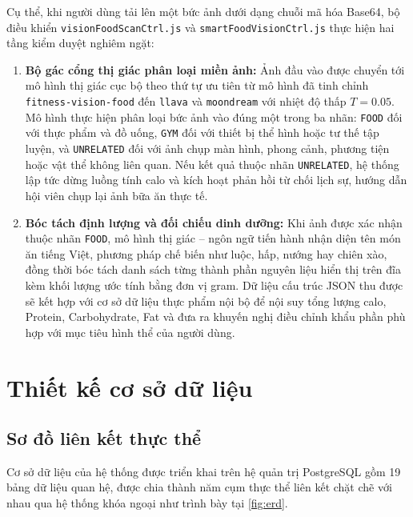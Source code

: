Cụ thể, khi người dùng tải lên một bức ảnh dưới dạng chuỗi mã hóa Base64, bộ điều khiển \texttt{visionFoodScanCtrl.js} và \texttt{smartFoodVisionCtrl.js} thực hiện hai tầng kiểm duyệt nghiêm ngặt:
\begin{enumerate}[label=\arabic*.]
    \item \textbf{Bộ gác cổng thị giác phân loại miền ảnh:} Ảnh đầu vào được chuyển tới mô hình thị giác cục bộ theo thứ tự ưu tiên từ mô hình đã tinh chỉnh \texttt{fitness-vision-food} đến \texttt{llava} và \texttt{moondream} với nhiệt độ thấp $T = 0.05$. Mô hình thực hiện phân loại bức ảnh vào đúng một trong ba nhãn: \texttt{FOOD} đối với thực phẩm và đồ uống, \texttt{GYM} đối với thiết bị thể hình hoặc tư thế tập luyện, và \texttt{UNRELATED} đối với ảnh chụp màn hình, phong cảnh, phương tiện hoặc vật thể không liên quan. Nếu kết quả thuộc nhãn \texttt{UNRELATED}, hệ thống lập tức dừng luồng tính calo và kích hoạt phản hồi từ chối lịch sự, hướng dẫn hội viên chụp lại ảnh bữa ăn thực tế.
    \item \textbf{Bóc tách định lượng và đối chiếu dinh dưỡng:} Khi ảnh được xác nhận thuộc nhãn \texttt{FOOD}, mô hình thị giác -- ngôn ngữ tiến hành nhận diện tên món ăn tiếng Việt, phương pháp chế biến như luộc, hấp, nướng hay chiên xào, đồng thời bóc tách danh sách từng thành phần nguyên liệu hiển thị trên đĩa kèm khối lượng ước tính bằng đơn vị gram. Dữ liệu cấu trúc JSON thu được sẽ kết hợp với cơ sở dữ liệu thực phẩm nội bộ để nội suy tổng lượng calo, Protein, Carbohydrate, Fat và đưa ra khuyến nghị điều chỉnh khẩu phần phù hợp với mục tiêu hình thể của người dùng.
\end{enumerate}

\section{Thiết kế cơ sở dữ liệu}
\label{sec:thietke_csdl}

\subsection{Sơ đồ liên kết thực thể}
\label{subsec:erd}

Cơ sở dữ liệu của hệ thống được triển khai trên hệ quản trị PostgreSQL gồm 19 bảng dữ liệu quan hệ, được chia thành năm cụm thực thể liên kết chặt chẽ với nhau qua hệ thống khóa ngoại như trình bày tại \cref{fig:erd}.


